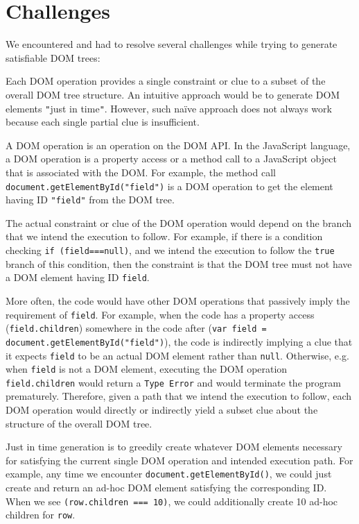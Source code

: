 \section{Challenges}
We encountered and had to resolve several challenges while trying to generate satisfiable DOM trees:


Each DOM operation provides a single constraint or clue to a subset of the overall DOM tree structure.  An intuitive approach would be to generate DOM elements {\tt "}just in time{\tt "}.  
However, such na\"ive approach does not always work because each single partial clue is insufficient.  

A DOM operation is an operation on the DOM API.  In the JavaScript language, a DOM operation is a property access or a method call to a JavaScript object that is associated with the DOM.  
For example, the method call {\tt document.getElementById("field")} is a DOM operation to get the element having ID {\tt "field"} from the DOM tree.  

The actual constraint or clue of the DOM operation would depend on the branch that we intend the execution to follow.  
For example, if there is a condition checking {\tt if (field===null)}, and we intend the execution to follow the {\tt true} branch of this condition,  
then the constraint is that the DOM tree must not have a DOM element having ID {\tt field}.  

More often, the code would have other DOM operations that passively imply the requirement of {\tt field}.  
For example, when the code has a property access ({\tt field.children}) somewhere in the code after ({\tt var field = document.getElementById("field")}), 
the code is indirectly implying a clue that it expects {\tt field} to be an actual DOM element rather than {\tt null}.  
Otherwise, e.g. when {\tt field} is not a DOM element, executing the DOM operation {\tt field.children} would return a {\tt Type Error} and would terminate the program prematurely.    
Therefore, given a path that we intend the execution to follow, each DOM operation would directly or indirectly yield a subset clue about the structure of the overall DOM tree.  

Just in time generation is to greedily create whatever DOM elements necessary for satisfying the current single DOM operation and intended execution path.    
For example, any time we encounter {\tt document.getElementById()}, we could just create and return an ad-hoc DOM element satisfying the corresponding ID.  
When we see {\tt (row.children === 10)}, we could additionally create 10 ad-hoc children for {\tt row}.  

